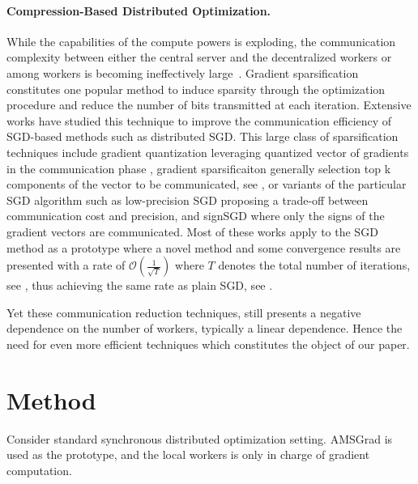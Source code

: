 \documentclass[11pt]{article}
\begin{document}
\paragraph{Compression-Based Distributed Optimization. }
While the capabilities of the compute powers is exploding, the communication complexity between either the central server and the decentralized workers or among workers is becoming ineffectively large~\citep{chilimbi2014project, mcmahan2017communication}. 
Gradient sparsification constitutes one popular method to induce sparsity through the optimization procedure and reduce the number of bits transmitted at each iteration.
Extensive works have studied this technique to improve the communication efficiency of SGD-based methods such as distributed SGD.
This large class of sparsification techniques include gradient quantization leveraging quantized vector of gradients in the communication phase \citep{alistarh2017qsgd,wen2017terngrad,jiang2018linear,wangni2017gradient,haddadpour2019trading,chen2010approximate,jegou2010product}, gradient sparsificaiton generally selection top k components of the vector to be communicated, see \citep{stich2018sparsified,aji2017sparse}, or variants of the particular SGD algorithm such as low-precision SGD \citep{bernstein2018signsgd,karimireddy2019error} proposing a trade-off between communication cost and precision, and signSGD \citep{de2017understanding,yang2019swalp} where only the signs of the gradient vectors are communicated.
Most of these works apply to the SGD method \citep{bottou2008} as a prototype where a novel method and some convergence results are presented with a rate of $\mathcal{O}(\frac{1}{\sqrt{T}})$ where $T$ denotes the total number of iterations, see \citep{alistarh2018convergence}, thus achieving the same rate as plain SGD, see \citep{ghadimi2013stochastic,karimi2019non}.

Yet these communication reduction techniques, still presents a negative dependence on the number of workers, typically a linear dependence.
Hence the need for even more efficient techniques which constitutes the object of our paper.




\section{Method}\label{sec:main}

Consider standard synchronous distributed optimization setting. AMSGrad is used as the prototype, and the local workers is only in charge of gradient computation.
\end{document}
